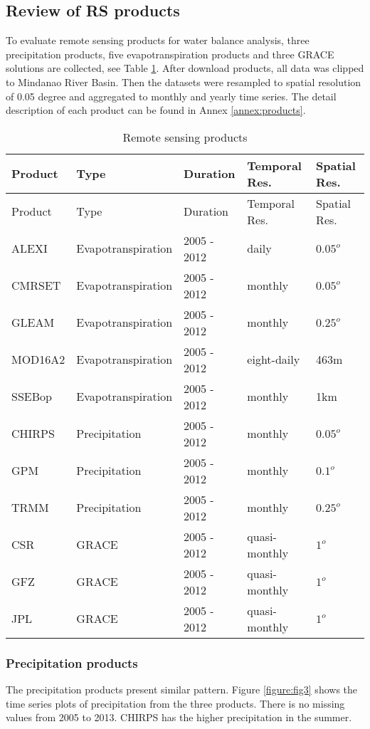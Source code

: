\documentclass{article}%
\begin{document}
\subsection{Review of RS products}%
\label{subsec:ReviewofRSproducts}%
To evaluate remote sensing products for water balance analysis, three precipitation products, five evapotranspiration products and three GRACE solutions are collected, see Table \ref{table:tab1}. After download products, all data was clipped to Mindanao River Basin. Then the datasets were resampled to spatial resolution of 0.05 degree and aggregated to monthly and yearly time series. The detail description of each product can be found in Annex \ref{annex:products}.%
\linebreak%
\begin{longtable}{|l|l|l|l|l|}%
\caption{Remote sensing products}%
\label{table:tab1}\\%
\hline%
\textbf{Product}&\textbf{Type}&\textbf{Duration}&\textbf{Temporal Res.}&\textbf{Spatial Res.}\\%
\hline%
\endfirsthead%
\hline%
Product&Type&Duration&Temporal Res.&Spatial Res.\\%
\hline%
\endhead%
\hline%
\endfoot%
ALEXI&Evapotranspiration&2005 - 2012&daily&$0.05^{o}$\\%
CMRSET&Evapotranspiration&2005 - 2012&monthly&$0.05^{o}$\\%
GLEAM&Evapotranspiration&2005 - 2012&monthly&$0.25^{o}$\\%
MOD16A2&Evapotranspiration&2005 - 2012&eight-daily&463m\\%
SSEBop&Evapotranspiration&2005 - 2012&monthly&1km\\%
CHIRPS&Precipitation&2005 - 2012&monthly&$0.05^{o}$\\%
GPM&Precipitation&2005 - 2012&monthly&$0.1^{o}$\\%
TRMM&Precipitation&2005 - 2012&monthly&$0.25^{o}$\\%
CSR&GRACE&2005 - 2012&quasi-monthly&$1^{o}$\\%
GFZ&GRACE&2005 - 2012&quasi-monthly&$1^{o}$\\%
JPL&GRACE&2005 - 2012&quasi-monthly&$1^{o}$\\%
\end{longtable}%
\subsubsection{Precipitation products}%
\label{ssubsec:Precipitationproducts}%
The precipitation products present similar pattern. Figure \ref{figure:fig3} shows the time series plots of precipitation from the three products. There is no missing values from 2005 to 2013. CHIRPS has the higher precipitation in the summer.%
\linebreak%
\end{document}
